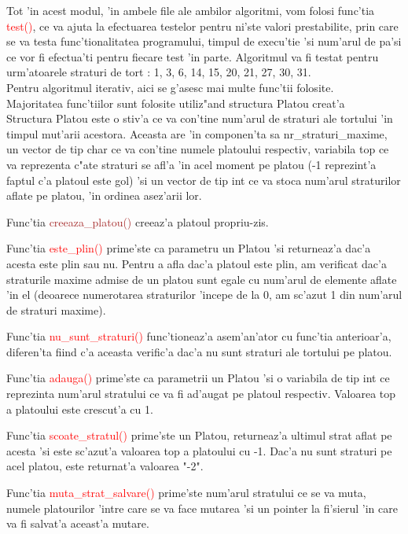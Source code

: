 \documentclass{article}
\begin{document}
Tot 'in acest modul, 'in ambele file ale ambilor algoritmi, vom folosi func'tia \textcolor{red}{test()}, ce va ajuta la efectuarea testelor pentru ni'ste valori prestabilite, prin care se va testa func'tionalitatea programului, timpul de execu'tie 'si num'arul de pa'si ce vor fi efectua'ti pentru fiecare test 'in parte. Algoritmul va fi testat pentru urm'atoarele straturi de tort : 1, 3, 6, 14, 15, 20, 21, 27, 30, 31.\\


Pentru algoritmul iterativ, aici se g'asesc mai multe func'tii folosite. \\
Majoritatea func'tiilor sunt folosite utiliz"and structura Platou creat'a \\
Structura Platou este o stiv'a ce va con'tine num'arul de straturi ale tortului 'in timpul mut'arii acestora. Aceasta are 'in componen'ta sa nr\_straturi\_maxime, un vector de tip char ce va con'tine numele platoului respectiv, variabila top ce va reprezenta c"ate straturi se afl'a 'in acel moment pe platou (-1 reprezint'a faptul c'a platoul este gol) 'si un vector de tip int ce va stoca num'arul straturilor aflate pe platou, 'in ordinea asez'arii lor.

Func'tia \textcolor{brown}{creeaza\_platou()} creeaz'a platoul propriu-zis.

Func'tia \textcolor{red}{este\_plin()} prime'ste ca parametru un Platou 'si returneaz'a dac'a acesta este plin sau nu. Pentru a afla dac'a platoul este plin, am verificat dac'a straturile maxime admise de un platou sunt egale cu num'arul de elemente aflate 'in el (deoarece numerotarea straturilor 'incepe de la 0, am sc'azut 1 din num'arul de straturi maxime).

Func'tia \textcolor{red}{nu\_sunt\_straturi()} func'tioneaz'a asem'an'ator cu func'tia anterioar'a, diferen'ta fiind c'a aceasta verific'a dac'a nu sunt straturi ale tortului pe platou.

Func'tia \textcolor{red}{adauga()} prime'ste ca parametrii un Platou 'si o variabila de tip int ce reprezinta num'arul stratului ce va fi ad'augat pe platoul respectiv. Valoarea top a platoului este crescut'a cu 1.

\newpage

Func'tia \textcolor{red}{scoate\_stratul()} prime'ste un Platou, returneaz'a ultimul strat aflat pe acesta 'si este sc'azut'a valoarea top a platoului cu -1. Dac'a nu sunt straturi pe acel platou, este returnat'a valoarea "-2".

Func'tia \textcolor{red}{muta\_strat\_salvare()} prime'ste num'arul stratului ce se va muta, numele platourilor 'intre care se va face mutarea 'si un pointer la fi'sierul 'in care va fi salvat'a aceast'a mutare.
\end{document}
